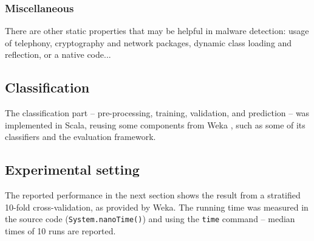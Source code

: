 \subsubsection{Miscellaneous}
There are other static properties that may be helpful in malware detection: usage of telephony, cryptography and network packages, dynamic class loading and reflection, or a native code...

\subsection{Classification}
The classification part -- pre-processing, training, validation, and prediction -- was implemented in Scala, reusing some components from Weka \cite{weka}, such as some of its classifiers and the evaluation framework.

\subsection{Experimental setting}
The reported performance in the next section shows the result from a stratified 10-fold cross-validation, as provided by Weka. The running time was measured in the source code (\texttt{System.nanoTime()}) and using the \texttt{time} command -- median times of 10 runs are reported.